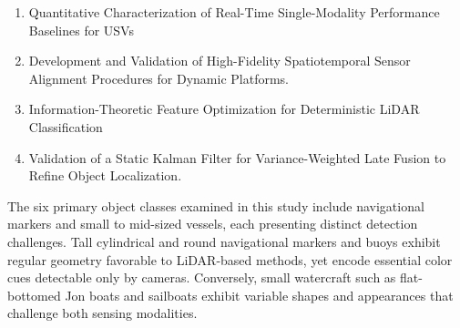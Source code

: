 \begin{enumerate}
    \item Quantitative Characterization of Real-Time Single-Modality Performance Baselines for USVs
    \item Development and Validation of High-Fidelity Spatiotemporal Sensor Alignment Procedures for Dynamic Platforms.
    \item Information-Theoretic Feature Optimization for Deterministic LiDAR Classification
    \item Validation of a Static Kalman Filter for Variance-Weighted Late Fusion to Refine Object Localization.
\end{enumerate}


The six primary object classes examined in this study include navigational markers and small to mid-sized vessels, each presenting distinct detection challenges. 
Tall cylindrical and round navigational markers and buoys exhibit regular geometry favorable to \ac{LiDAR}-based methods, yet encode essential color cues detectable only by cameras. 
Conversely, small watercraft such as flat-bottomed Jon boats and sailboats exhibit variable shapes and appearances that challenge both sensing modalities.



